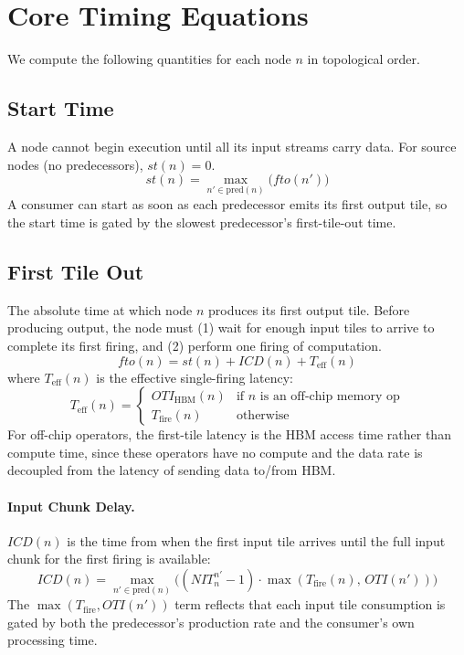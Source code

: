 \documentclass[10pt]{article}
\begin{document}
\section{Core Timing Equations}

We compute the following quantities for each node $n$ in topological order.

\subsection{Start Time}

A node cannot begin execution until all its input streams carry data. For source nodes (no predecessors), $\mathit{st}(n) = 0$.
\begin{equation}
    \mathit{st}(n) = \max_{n' \in \text{pred}(n)} \bigl(\mathit{fto}(n')\bigr)
\end{equation}
A consumer can start as soon as each predecessor emits its first output tile, so the start time is gated by the slowest predecessor's first-tile-out time.

\subsection{First Tile Out}

The absolute time at which node $n$ produces its first output tile. Before producing output, the node must (1) wait for enough input tiles to arrive to complete its first firing, and (2) perform one firing of computation.
\begin{equation}
    \mathit{fto}(n) = \mathit{st}(n) + \mathit{ICD}(n) + T_{\text{eff}}(n)
\end{equation}
where $T_{\text{eff}}(n)$ is the effective single-firing latency:
\begin{equation}
    T_{\text{eff}}(n) = \begin{cases}
        \mathit{OTI}_{\text{HBM}}(n) & \text{if } n \text{ is an off-chip memory op} \\
        T_{\text{fire}}(n) & \text{otherwise}
    \end{cases}
\end{equation}
For off-chip operators, the first-tile latency is the HBM access time rather than compute time, since these operators have no compute and the data rate is decoupled from the latency of sending data to/from HBM.

\paragraph{Input Chunk Delay.}
$\mathit{ICD}(n)$ is the time from when the first input tile arrives until the full input chunk for the first firing is available:
\begin{equation}
    \mathit{ICD}(n) = \max_{n' \in \text{pred}(n)} \bigl((\mathit{NIT}^{n'}_n - 1) \cdot \max(T_{\text{fire}}(n),\, \mathit{OTI}(n'))\bigr)
\end{equation}
The $\max(T_{\text{fire}}, \mathit{OTI}(n'))$ term reflects that each input tile consumption is gated by both the predecessor's production rate and the consumer's own processing time.
\end{document}
